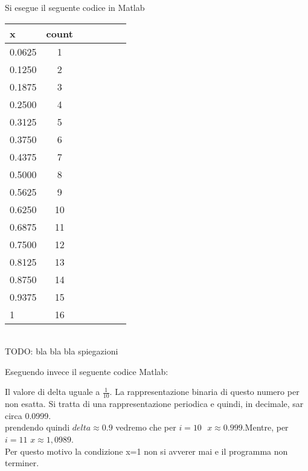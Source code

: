 Si esegue il seguente codice in Matlab



\begin{tabular}{l*{6}{c}}
 x  &  count \\
\hline
 0.0625 & 1 \\
 0.1250 & 2 \\
 0.1875 & 3 \\
 0.2500 & 4 \\
 0.3125 & 5 \\
 0.3750 & 6 \\
 0.4375 & 7 \\
 0.5000 & 8 \\
 0.5625 & 9 \\
 0.6250 & 10 \\
 0.6875 & 11 \\
 0.7500 & 12 \\
 0.8125 & 13 \\
 0.8750 & 14 \\
 0.9375 & 15 \\
      1 & 16 \\
\end{tabular} \\

\noindent TODO: bla bla bla spiegazioni

\noindent Eseguendo invece il seguente codice Matlab:



Il valore di delta  uguale a \(\frac{1}{10}\). La rappresentazione binaria di questo numero per non  esatta.
Si tratta di una rappresentazione periodica e quindi, in decimale, sar circa 0.0999.\\
prendendo quindi $delta\approx0.9$ vedremo che per $i=10 \mbox{   }x\approx0.999$.Mentre, per $i=11$  $x\approx1,0989$.\\
Per questo motivo la condizione x=1 non si avverer mai e il programma non terminer.

